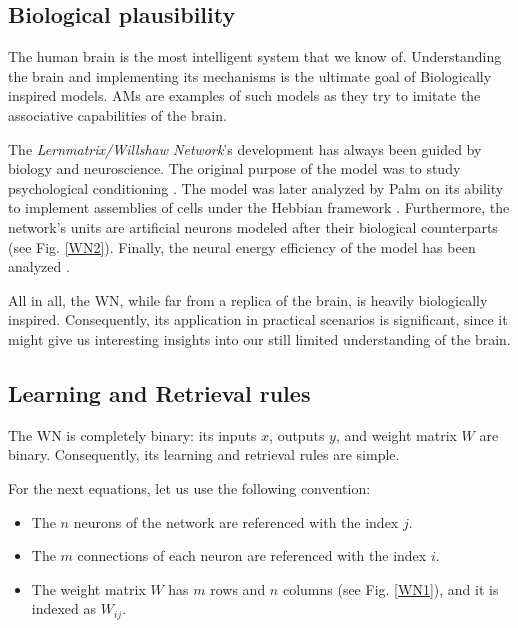 \documentclass[runningheads]{llncs}
\begin{document}
\subsection{Biological plausibility}
\label{sec:wn_bio}
The human brain is the most intelligent system that we know of. Understanding the brain and implementing its mechanisms is the ultimate goal of Biologically inspired models. AMs are examples of such models as they try to imitate the associative capabilities of the brain.

The \textit{Lernmatrix/Willshaw Network}'s development has always been guided by biology and neuroscience. The original purpose of the model was to study psychological conditioning \cite{steinbuch1961lernmatrix,steinbuch1965automat}.
The model was later analyzed by Palm \cite{palm1982neural} on its ability to implement assemblies of cells under the Hebbian framework \cite{hebb2005organization}.
Furthermore, the network's units are artificial neurons \cite{mcculloch1943logical} modeled after their biological counterparts (see Fig. \ref{WN2}). Finally, the neural energy efficiency of the model has been analyzed \cite{laughlin2003communication,lennie2003cost}.

All in all, the WN, while far from a replica of the brain, is heavily biologically inspired. Consequently, its application in practical scenarios is significant, since it might give us interesting insights into our still limited understanding of the brain. 

\subsection{Learning and Retrieval rules}
\label{sec:wn_rules}
The WN is completely binary: its inputs $x$, outputs $y$, and weight matrix $W$ are binary. Consequently, its learning and retrieval rules are simple.
\newline

For the next equations, let us use the following convention:
\begin{itemize}
    \item The $n$ neurons of the network are referenced with the index $j$.
    \item The $m$ connections of each neuron are referenced with the index $i$.
    \item The weight matrix $W$ has $m$ rows and $n$ columns (see Fig. \ref{WN1}), and it is indexed as $W_{ij}$.
\end{itemize}
\end{document}
